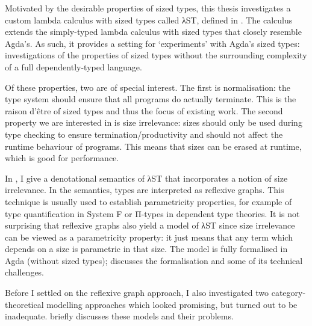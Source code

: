 Motivated by the desirable properties of sized types, this thesis investigates a
custom lambda calculus with sized types called λST, defined in .
The calculus extends the simply-typed lambda calculus with sized types that
closely resemble Agda's. As such, it provides a setting for
\enquote*{experiments} with Agda's sized types: investigations of the properties
of sized types without the surrounding complexity of a full dependently-typed
language.

Of these properties, two are of special interest. The first is normalisation:
the type system should ensure that all programs do actually terminate. This is
the raison d'être of sized types and thus the focus of existing work. The
second property we are interested in is size irrelevance: sizes should only be
used during type checking to ensure termination/productivity and should not
affect the runtime behaviour of programs. This means that sizes can be erased at
runtime, which is good for performance.

In , I give a denotational semantics of λST that incorporates a
notion of size irrelevance. In the semantics, types are interpreted as reflexive
graphs. This technique is usually used to establish parametricity properties,
for example of type quantification in System F or Π-types in dependent type
theories. It is not surprising that reflexive graphs also yield a model of λST
since size irrelevance can be viewed as a parametricity property: it just means
that any term which depends on a size is parametric in that size. The model is
fully formalised in Agda (without sized types); 
discusses the formalisation and some of its technical challenges.

Before I settled on the reflexive graph approach, I also investigated two
category-theoretical modelling approaches which looked promising, but turned out
to be inadequate.  briefly discusses these models and their
problems.

